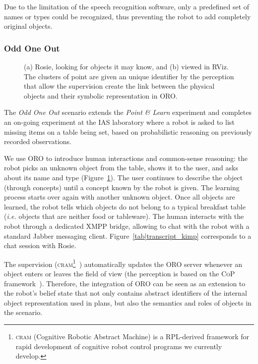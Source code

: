 Due to the limitation of the speech recognition software, only a predefined set
of names or types could be recognized, thus preventing the robot to add
completely original objects.

\subsubsection{Odd One Out}
\label{expe|odd_one_out}

\begin{figure}
\centering


    \caption{(a) Rosie, looking for objects it may know, and (b) viewed in
    RViz. The clusters of point are given an unique identifier by the
    perception that allow the supervision create the link between the physical
    objects and their symbolic representation in ORO.}

\label{fig|kimpwatching}
\end{figure}


The \emph{Odd One Out} scenario extends the \textit{Point \& Learn} experiment
and completes an on-going experiment at the IAS laboratory where a robot is
asked to list missing items on a table being set, based on probabilistic
reasoning on previously recorded observations.

We use ORO to introduce human interactions and common-sense reasoning: the
robot picks an unknown object from the table, shows it to the user, and asks
about its name and type (Figure~\ref{fig|kimpwatching}). The user continues to
describe the object (through concepts) until a concept known by the robot is
given. The learning process starts over again with another unknown object. Once
all objects are learned, the robot tells which objects do not belong to a
typical breakfast table (\textit{i.e.} objects that are neither food or
tableware). The human interacts with the robot through a dedicated XMPP bridge,
allowing to chat with the robot with a standard Jabber messaging client.
Figure~\ref{tab|transcript_kimp} corresponds to a chat session with Rosie.

The supervision (\textsc{cram}\footnote{\textsc{cram} (Cognitive Robotic
Abstract Machine) is a RPL-derived framework for rapid development of cognitive
robot control programs we currently develop.}~\cite{Beetz2010}) automatically
updates the ORO server whenever an object enters or leaves the field of view
(the perception is based on the \textsc{CoP} framework~\cite{Klank2009}).
Therefore, the integration of ORO can be seen as an extension to the robot's
belief state that not only contains abstract identifiers of the internal object
representation used in plans, but also the semantics and roles of objects in
the scenario.

